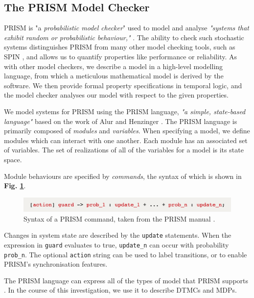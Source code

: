 \documentclass{l4proj}
\begin{document}
\subsection{The PRISM Model Checker}

PRISM \cite{KNP11} is "a \textit{probabilistic model checker}" used to model and analyse \textit{"systems that exhibit random or probabilistic behaviour,"} \cite{pweb1}. The ability to check such stochastic systems distinguishes PRISM from many other model checking tools, such as SPIN \cite{spin}, and allows us to quantify properties like performance or reliability. As with other model checkers, we describe a model in a high-level modelling language, from which a meticulous mathematical model is derived by the software. We then provide formal property specifications in temporal logic, and the model checker analyses our model with respect to the given properties.

We model systems for PRISM using the PRISM language, \textit{"a simple, state-based language"} \cite{prsmlang} based on the work of Alur and Henzinger \cite{AH99}. The PRISM language is primarily composed of \textit{modules} and \textit{variables}. When specifying a model, we define modules which can interact with one another. Each module has an associated set of variables. The set of  realizations of all of the variables for a model is its state space.

Module behaviours are specified by \textit{commands}, the syntax of which is shown in \textbf{Fig. \ref{fig:prsmcmd}}.

\begin{figure}[h]
    \centering
    \includegraphics[scale=0.6]{images/commandexample.png}   
    \caption{Syntax of a PRISM command, taken from the PRISM manual \cite{prsmlang}.}
    \label{fig:prsmcmd} 
\end{figure}

Changes in system state are described by the \texttt{update} statements. When the expression in \texttt{guard} evaluates to true, \texttt{update\_n} can occur with probability \texttt{prob\_n}. The optional \texttt{action} string can be used to label transitions, or to enable PRISM's synchronisation features.

The PRISM language can express all of the types of model that PRISM supports \cite{prsmlang}. In the course of this investigation, we use it to describe DTMCs and MDPs. 
\end{document}
